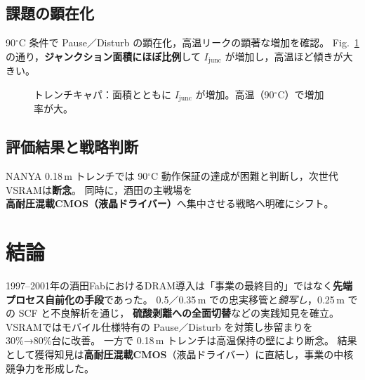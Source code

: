 \documentclass[conference]{IEEEtran}
\begin{document}
\subsection{課題の顕在化}
90$^\circ$C 条件で Pause／Disturb の顕在化，高温リークの顕著な増加を確認。
Fig.~\ref{fig:trench_area_leak} の通り，\textbf{ジャンクション面積にほぼ比例}して $I_{\mathrm{junc}}$ が増加し，高温ほど傾きが大きい。

\begin{figure}[t]
\centering
{}
\caption{トレンチキャパ：面積とともに $I_{\mathrm{junc}}$ が増加。高温（90$^\circ$C）で増加率が大。}
\label{fig:trench_area_leak}
\end{figure}

\subsection{評価結果と戦略判断}
NANYA 0.18\,\textmu m トレンチでは 90$^\circ$C 動作保証の達成が困難と判断し，次世代VSRAMは\textbf{断念}。
同時に，酒田の主戦場を\textbf{高耐圧混載CMOS（液晶ドライバー）}へ集中させる戦略へ明確にシフト。

\section{結論}
1997--2001年の酒田FabにおけるDRAM導入は「事業の最終目的」ではなく\textbf{先端プロセス自前化の手段}であった。
0.5／0.35\,\textmu m での忠実移管と\emph{鏡写し}，0.25\,\textmu m での SCF と不良解析を通じ，
\textbf{硫酸剥離への全面切替}などの実践知見を確立。
VSRAMではモバイル仕様特有の Pause／Disturb を対策し歩留まりを 30\%→80\%台に改善。
一方で 0.18\,\textmu m トレンチは高温保持の壁により断念。
結果として獲得知見は\textbf{高耐圧混載CMOS}（液晶ドライバー）に直結し，事業の中核競争力を形成した。
\end{document}
